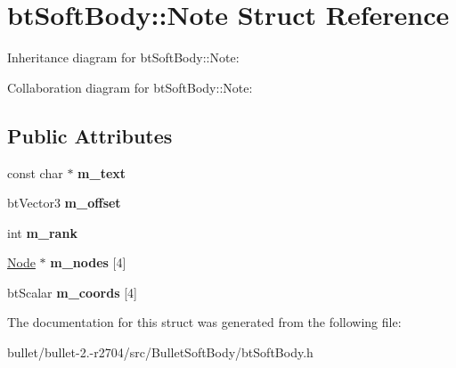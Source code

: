 \hypertarget{structbt_soft_body_1_1_note}{\section{bt\+Soft\+Body\+:\+:Note Struct Reference}
\label{structbt_soft_body_1_1_note}
}


Inheritance diagram for bt\+Soft\+Body\+:\+:Note\+:


Collaboration diagram for bt\+Soft\+Body\+:\+:Note\+:
\subsection*{Public Attributes}
\begin{DoxyCompactItemize}
\item 
\hypertarget{structbt_soft_body_1_1_note_adfb1568162e3a01e73c226e1727c7468}{const char $\ast$ {\bfseries m\+\_\+text}}\label{structbt_soft_body_1_1_note_adfb1568162e3a01e73c226e1727c7468}

\item 
\hypertarget{structbt_soft_body_1_1_note_a8fec523bbe4d172e0e783ed7a9bd3a7e}{bt\+Vector3 {\bfseries m\+\_\+offset}}\label{structbt_soft_body_1_1_note_a8fec523bbe4d172e0e783ed7a9bd3a7e}

\item 
\hypertarget{structbt_soft_body_1_1_note_aa01e3e06ddf3ed1539b501fec0d25332}{int {\bfseries m\+\_\+rank}}\label{structbt_soft_body_1_1_note_aa01e3e06ddf3ed1539b501fec0d25332}

\item 
\hypertarget{structbt_soft_body_1_1_note_aca99ac080d4282d94667fd9d527914c2}{\hyperlink{structbt_soft_body_1_1_node}{Node} $\ast$ {\bfseries m\+\_\+nodes} \mbox{[}4\mbox{]}}\label{structbt_soft_body_1_1_note_aca99ac080d4282d94667fd9d527914c2}

\item 
\hypertarget{structbt_soft_body_1_1_note_a68226826ba138cc3ecb6968857821726}{bt\+Scalar {\bfseries m\+\_\+coords} \mbox{[}4\mbox{]}}\label{structbt_soft_body_1_1_note_a68226826ba138cc3ecb6968857821726}

\end{DoxyCompactItemize}


The documentation for this struct was generated from the following file\+:\begin{DoxyCompactItemize}
\item 
bullet/bullet-\/2.-\/r2704/src/\+Bullet\+Soft\+Body/bt\+Soft\+Body.\+h\end{DoxyCompactItemize}
